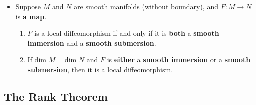 \documentclass[11pt]{article}
\begin{document}
\begin{itemize}
\item \begin{proposition}
Suppose $M$ and $N$ are smooth manifolds (without boundary), and $F: M \rightarrow N$ is \textbf{a map}.
\begin{enumerate}
\item $F$ is a local diffeomorphism if and only if it is \textbf{both} a \textbf{smooth immersion} and a \textbf{smooth submersion}.
\item If $\text{dim }M = \text{dim }N$ and $F$ is \textbf{either} a \textbf{smooth immersion} or a \textbf{smooth submersion}, then it is a local diffeomorphism.
\end{enumerate}
\end{proposition}
\end{itemize}

\subsection{The Rank Theorem}
\end{document}
